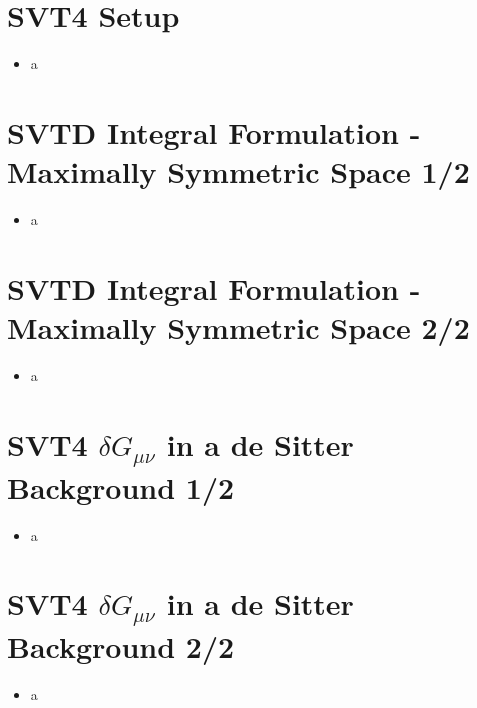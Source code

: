 \documentclass[10pt,letterpaper]{article}
\numberwithin{equation}{section}
\begin{document}
\section{SVT4 Setup}
\begin{itemize}
	\item a
\end{itemize}


\section{SVTD Integral Formulation - Maximally Symmetric Space 1/2}
\begin{itemize}
	\item a
\end{itemize}


\section{SVTD Integral Formulation - Maximally Symmetric Space 2/2}
\begin{itemize}
	\item a
\end{itemize}


\section{SVT4 $\delta G_{\mu\nu}$ in a de Sitter Background 1/2}
\begin{itemize}
	\item a
\end{itemize}


\section{SVT4 $\delta G_{\mu\nu}$ in a de Sitter Background 2/2}
\begin{itemize}
	\item a
\end{itemize}
\end{document}
